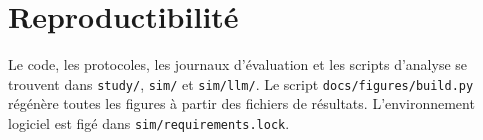\documentclass[11pt,a4paper]{article}
\begin{document}
\section{Reproductibilité}\label{reproductibilituxe9}

Le code, les protocoles, les journaux d'évaluation et les scripts
d'analyse se trouvent dans \texttt{study/}, \texttt{sim/} et
\texttt{sim/llm/}. Le script \texttt{docs/figures/build.py} régénère
toutes les figures à partir des fichiers de résultats. L'environnement
logiciel est figé dans \texttt{sim/requirements.lock}.

\printbibliography[title={Références}]
\end{document}

